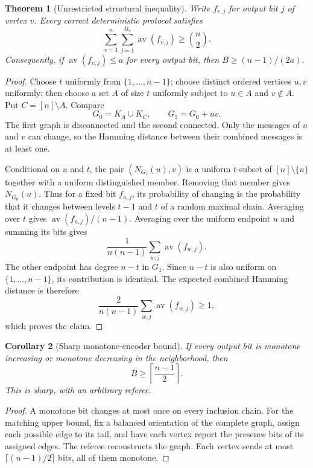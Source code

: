 \documentclass[11pt]{article}
\newtheorem{theorem}{Theorem}[section]
\newtheorem{corollary}[theorem]{Corollary}
\theoremstyle{definition}\newtheorem{definition}[theorem]{Definition}
\theoremstyle{remark}\newtheorem{remark}[theorem]{Remark}
\newcommand{\av}{\operatorname{av}}
\begin{document}
\begin{theorem}[Unrestricted structural inequality]\label{thm:alt}
Write $f_{v,j}$ for output bit $j$ of vertex $v$. Every correct deterministic protocol satisfies
\[
 \boxed{\sum_{v=1}^n\sum_{j=1}^{B_v}\av(f_{v,j})\ge\binom n2.}
\]
Consequently, if $\av(f_{v,j})\le a$ for every output bit, then
$B\ge(n-1)/(2a)$.
\end{theorem}
\begin{proof}
Choose $t$ uniformly from $\{1,\ldots,n-1\}$; choose distinct ordered vertices $u,v$ uniformly; then choose a set $A$ of size $t$ uniformly subject to $u\in A$ and $v\notin A$. Put $C=[n]\setminus A$. Compare
\[
 G_0=K_A\cup K_C,\qquad G_1=G_0+uv.
\]
The first graph is disconnected and the second connected. Only the messages of $u$ and $v$ can change, so the Hamming distance between their combined messages is at least one.

Conditional on $u$ and $t$, the pair $(N_{G_1}(u),v)$ is a uniform $t$-subset of $[n]\setminus\{u\}$ together with a uniform distinguished member. Removing that member gives $N_{G_0}(u)$. Thus for a fixed bit $f_{u,j}$, its probability of changing is the probability that it changes between levels $t-1$ and $t$ of a random maximal chain. Averaging over $t$ gives $\av(f_{u,j})/(n-1)$. Averaging over the uniform endpoint $u$ and summing its bits gives
\[
 \frac{1}{n(n-1)}\sum_{w,j}\av(f_{w,j}).
\]
The other endpoint has degree $n-t$ in $G_1$. Since $n-t$ is also uniform on $\{1,\ldots,n-1\}$, its contribution is identical. The expected combined Hamming distance is therefore
\[
 \frac{2}{n(n-1)}\sum_{w,j}\av(f_{w,j})\ge1,
\]
which proves the claim.
\end{proof}

\begin{corollary}[Sharp monotone-encoder bound]
If every output bit is monotone increasing or monotone decreasing in the neighborhood, then
\[
 B\ge\left\lceil\frac{n-1}{2}\right\rceil.
\]
This is sharp, with an arbitrary referee.
\end{corollary}
\begin{proof}
A monotone bit changes at most once on every inclusion chain. For the matching upper bound, fix a balanced orientation of the complete graph, assign each possible edge to its tail, and have each vertex report the presence bits of its assigned edges. The referee reconstructs the graph. Each vertex sends at most $\lceil(n-1)/2\rceil$ bits, all of them monotone.
\end{proof}
\end{document}
